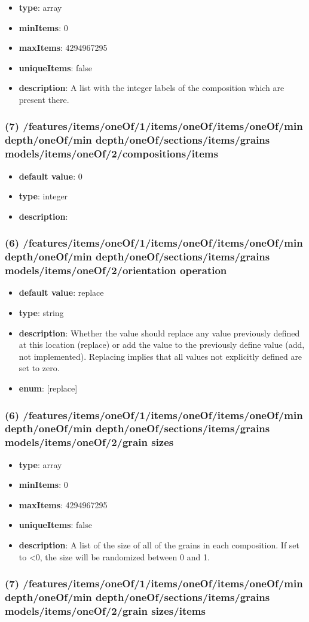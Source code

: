 \begin{itemize}[leftmargin=6em]\item {\bf type}: array
\item {\bf minItems}: 0
\item {\bf maxItems}: 4294967295
\item {\bf uniqueItems}: false
\item {\bf description}: A list with the integer labels of the composition which are present there.
\end{itemize}\subsubsection{(7) /features/items/oneOf/1/items/oneOf/items/oneOf/min depth/oneOf/min depth/oneOf/sections/items/grains models/items/oneOf/2/compositions/items}
\begin{itemize}[leftmargin=7em]\item {\bf default value}: 0
\item {\bf type}: integer
\item {\bf description}: 
\end{itemize}\subsubsection{(6) /features/items/oneOf/1/items/oneOf/items/oneOf/min depth/oneOf/min depth/oneOf/sections/items/grains models/items/oneOf/2/orientation operation}
\begin{itemize}[leftmargin=6em]\item {\bf default value}: replace
\item {\bf type}: string
\item {\bf description}: Whether the value should replace any value previously defined at this location (replace) or add the value to the previously define value (add, not implemented). Replacing implies that all values not explicitly defined are set to zero.
\item {\bf enum}: [replace]\end{itemize}\subsubsection{(6) /features/items/oneOf/1/items/oneOf/items/oneOf/min depth/oneOf/min depth/oneOf/sections/items/grains models/items/oneOf/2/grain sizes}
\begin{itemize}[leftmargin=6em]\item {\bf type}: array
\item {\bf minItems}: 0
\item {\bf maxItems}: 4294967295
\item {\bf uniqueItems}: false
\item {\bf description}: A list of the size of all of the grains in each composition. If set to <0, the size will be randomized between 0 and 1.
\end{itemize}\subsubsection{(7) /features/items/oneOf/1/items/oneOf/items/oneOf/min depth/oneOf/min depth/oneOf/sections/items/grains models/items/oneOf/2/grain sizes/items}
